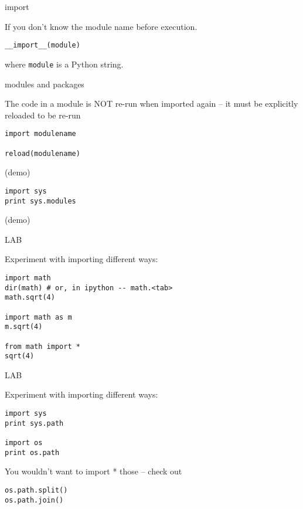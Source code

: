 \documentclass{beamer}
\begin{document}
\begin{frame}[fragile]{import}

\vfill
If you don’t know the module name before execution.

\vfill
\begin{verbatim}
__import__(module)
\end{verbatim}

\vfill
where \verb+module+ is a Python string.

\vfill
\end{frame}

\begin{frame}[fragile]{modules and packages}

\vfill
{\Large The code in a module is NOT re-run when imported again
 -- it must be explicitly reloaded to be re-run}

\begin{verbatim}
import modulename

reload(modulename)
\end{verbatim}

(demo)

\begin{verbatim}
import sys
print sys.modules
\end{verbatim}
(demo)
\end{frame}


\begin{frame}[fragile]{LAB}

{\Large  Experiment with importing different ways:}
\begin{verbatim}
import math
dir(math) # or, in ipython -- math.<tab>
math.sqrt(4)

import math as m
m.sqrt(4)

from math import *
sqrt(4)
\end{verbatim}

\end{frame}

\begin{frame}[fragile]{LAB}

{\Large  Experiment with importing different ways:}
\begin{verbatim}
import sys
print sys.path

import os
print os.path
\end{verbatim}
{\Large You wouldn't want to import * those -- check out}
\begin{verbatim}
os.path.split()
os.path.join()
\end{verbatim}

\end{frame}
\end{document}
